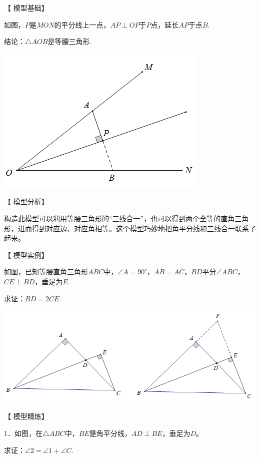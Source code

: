 \documentclass[10pt]{ctexart}
\begin{document}
【 {\heiti 模型基础}】

如图，$P$是$MON$的平分线上一点，$AP\perp OP$于$P$点，延长$AP$于点$B$.

结论：$\triangle AOB$是等腰三角形.

\begin{flushright}
	\includegraphics[scale=0.6]{figure/jiaopfxian07}
\end{flushright}

【 {\heiti 模型分析}】

构造此模型可以利用等腰三角形的“三线合一”，也可以得到两个全等的直角三角形，进而得到对应边、对应角相等。这个模型巧妙地把角平分线和三线合一联系了起来。

【 {\heiti 模型实例}】

如图，已知等腰直角三角形$ABC$中，$\angle A=90^\circ$，$AB=AC$，$BD$平分$\angle ABC$，
$CE\perp BD$，垂足为$E$.

求证：$BD=2CE$.

\begin{flushright}
	\includegraphics[scale=0.6]{figure/jiaopfxian08}
\end{flushright}

【 {\heiti 模型精炼}】
\begin{shaded}
1．如图，在$\triangle ABC$中，$BE$是角平分线，$AD\perp BE$，垂足为$D$。

求证：$\angle 2=\angle 1+\angle C $.
\end{shaded}
\end{document}
